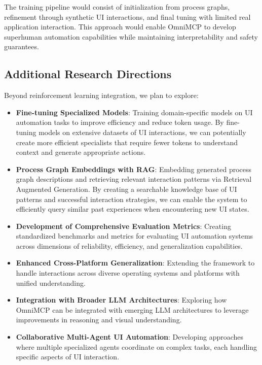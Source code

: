\documentclass{article}
\begin{document}
The training pipeline would consist of initialization from process graphs, refinement through synthetic UI interactions, and final tuning with limited real application interaction. This approach would enable OmniMCP to develop superhuman automation capabilities while maintaining interpretability and safety guarantees.

\subsection{Additional Research Directions}

Beyond reinforcement learning integration, we plan to explore:

\begin{itemize}
    \item \textbf{Fine-tuning Specialized Models}: Training domain-specific models on UI automation tasks to improve efficiency and reduce token usage. By fine-tuning models on extensive datasets of UI interactions, we can potentially create more efficient specialists that require fewer tokens to understand context and generate appropriate actions.
    
    \item \textbf{Process Graph Embeddings with RAG}: Embedding generated process graph descriptions and retrieving relevant interaction patterns via Retrieval Augmented Generation. By creating a searchable knowledge base of UI patterns and successful interaction strategies, we can enable the system to efficiently query similar past experiences when encountering new UI states.
    
    \item \textbf{Development of Comprehensive Evaluation Metrics}: Creating standardized benchmarks and metrics for evaluating UI automation systems across dimensions of reliability, efficiency, and generalization capabilities.
    
    \item \textbf{Enhanced Cross-Platform Generalization}: Extending the framework to handle interactions across diverse operating systems and platforms with unified understanding.
    
    \item \textbf{Integration with Broader LLM Architectures}: Exploring how OmniMCP can be integrated with emerging LLM architectures to leverage improvements in reasoning and visual understanding.
    
    \item \textbf{Collaborative Multi-Agent UI Automation}: Developing approaches where multiple specialized agents coordinate on complex tasks, each handling specific aspects of UI interaction.
\end{itemize}
\end{document}
